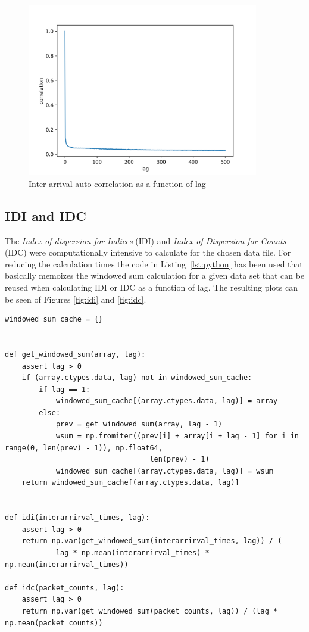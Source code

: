 \documentclass[a4paper]{article}
\begin{document}
\begin{figure}[H]
    \centering
    \includegraphics[width=0.9\textwidth]{figures/interarrival_correlation.png}
    \caption{Inter-arrival auto-correlation as a function of lag}
    \label{fig:interarrcorr}
\end{figure}

\subsection{IDI and IDC}

The \emph{Index of dispersion for Indices} (IDI) and \emph{Index of Dispersion for Counts} (IDC) were computationally intensive to calculate for the chosen data file.
For reducing the calculation times the code in Listing~\ref{lst:python} has been used that basically memoizes the windowed sum 
calculation for a given data set that can be reused when calculating IDI or IDC as a function of lag. The resulting plots can be seen of Figures \ref{fig:idi} and \ref{fig:idc}.

\begin{lstlisting}[style=mypython,caption={The functions used for calculating IDI and IDC},label={lst:python}]
windowed_sum_cache = {}


def get_windowed_sum(array, lag):
    assert lag > 0
    if (array.ctypes.data, lag) not in windowed_sum_cache:
        if lag == 1:
            windowed_sum_cache[(array.ctypes.data, lag)] = array
        else:
            prev = get_windowed_sum(array, lag - 1)
            wsum = np.fromiter((prev[i] + array[i + lag - 1] for i in range(0, len(prev) - 1)), np.float64,
                                  len(prev) - 1)
            windowed_sum_cache[(array.ctypes.data, lag)] = wsum
    return windowed_sum_cache[(array.ctypes.data, lag)]


def idi(interarrirval_times, lag):
    assert lag > 0
    return np.var(get_windowed_sum(interarrirval_times, lag)) / (
            lag * np.mean(interarrirval_times) * np.mean(interarrirval_times))

def idc(packet_counts, lag):
    assert lag > 0
    return np.var(get_windowed_sum(packet_counts, lag)) / (lag * np.mean(packet_counts))

\end{lstlisting}
\end{document}
